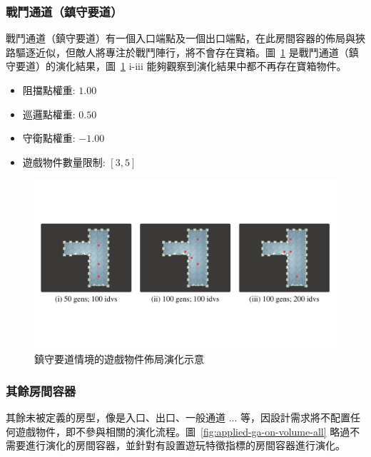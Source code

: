 \subsubsection{戰鬥通道（鎮守要道）}
\label{sssec:method-segments-appliedonvolumes-battlepath-trunk}

戰鬥通道（鎮守要道）有一個入口端點及一個出口端點，在此房間容器的佈局與狹路驅逐近似，但敵人將專注於戰鬥陣行，將不會存在寶箱。圖~\ref{fig:applied-ga-on-volume-battlepath-trunk} 是戰鬥通道（鎮守要道）的演化結果，圖~\ref{fig:applied-ga-on-volume-battlepath-trunk} i-iii 能夠觀察到演化結果中都不再存在寶箱物件。

\begin{itemize}
  \setlength\itemsep{-0.5em}
  \item 阻擋點權重: $1.00$
  \item 巡邏點權重: $0.50$
  \item 守衛點權重: $-1.00$
  \item 遊戲物件數量限制: $[3, 5]$
\end{itemize}

\begin{figure}[H]
  \begin{center}
    \includegraphics[width=1.0\textwidth]{figures/applied-ga-on-volume-battlepath-trunk.pdf}
    \caption{鎮守要道情境的遊戲物件佈局演化示意} 
    \label{fig:applied-ga-on-volume-battlepath-trunk}
  \end{center}
\end{figure}

\subsubsection{其餘房間容器}
\label{sssec:method-segments-appliedonvolumes-others}

其餘未被定義的房型，像是入口、出口、一般通道 ... 等，因設計需求將不配置任何遊戲物件，即不參與相關的演化流程。圖~\ref{fig:applied-ga-on-volume-all} 略過不需要進行演化的房間容器，並針對有設置遊玩特徵指標的房間容器進行演化。

